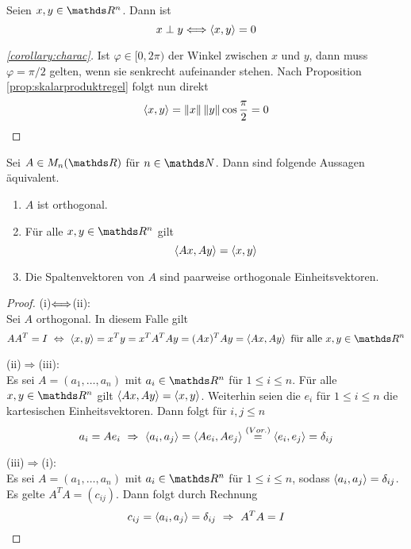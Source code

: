 		\begin{corollary}
		\label{corollary:charac}
			Seien $x,y\in\SR^n$.
			Dann ist
			\[
				x \perp y \Longleftrightarrow \left\langle x,y \right\rangle = 0
			\]
		\end{corollary}
		\begin{proof}[\corollarycall  \ref{corollary:charac}]
			Ist $\varphi\in [0,2\pi)$ der Winkel zwischen $x$ und $y$, dann muss $\varphi = \pi/2$ gelten, wenn sie senkrecht aufeinander stehen.
			Nach Proposition \ref{prop:skalarproduktregel} folgt nun direkt
			\[
				\left\langle x,y \right\rangle = \left\| x \right\|\left\| y \right\|\cos\frac{\pi}{2} = 0
			\]
		\end{proof}

		\begin{theorem}
		\label{theorem:charakterisierung orthogonale matrizen}
			Sei $A\in M_n(\SR)$ für $n\in\SN$. 
			Dann sind folgende Aussagen äquivalent.
			\begin{enumerate}[label = \normalfont(\roman*)]
				\item $A$ ist orthogonal.
				\item Für alle $x,y\in\SR^n$ gilt
					\[
						\left\langle Ax,Ay \right\rangle = \left\langle x,y \right\rangle
					\]
				\item Die Spaltenvektoren von $A$ sind paarweise orthogonale Einheitsvektoren.
			\end{enumerate}
		\end{theorem}
		\begin{proof}
			(i)$\Longleftrightarrow$(ii):\\
			Sei $A$ orthogonal. 
			In diesem Falle gilt
			\[
				AA^T=I \ \Leftrightarrow \ \angleb{x,y} = x^Ty = x^TA^TAy = (Ax)^TAy = \angleb{Ax,Ay} \text{ für alle } x,y\in\SR^n
			\]

			(ii)$\Rightarrow$(iii):\\
			Es sei $A=(a_1,\ldots,a_n)$ mit $a_i\in\SR^n$ für $1\leq i\leq n$. Für alle $x,y\in\SR^n$ gilt $\left\langle Ax,Ay \right\rangle = \left\langle x,y \right\rangle$.
			Weiterhin seien die $e_i$ für $1\leq i\leq n$ die kartesischen Einheitsvektoren.
			Dann folgt für $i,j\leq n$
			\[
				a_i = Ae_i \ \Rightarrow \ \left\langle a_i,a_j \right\rangle = \left\langle Ae_i, Ae_j \right\rangle \stackrel{(Vor.)}{=} \left\langle e_i,e_j \right\rangle = \delta_{ij}
			\]


			(iii)$\Rightarrow$(i):\\
			Es sei $A=(a_1,\ldots,a_n)$ mit $a_i\in\SR^n$ für $1\leq i\leq n$, sodass $\left\langle a_i,a_j \right\rangle=\delta_{ij}$.
			Es gelte $A^TA = (c_{ij})$.
			Dann folgt durch Rechnung
			\[
				c_{ij} = \left\langle a_i,a_j \right\rangle = \delta_{ij} \ \Rightarrow \ A^TA=I
			\]
		\end{proof}


